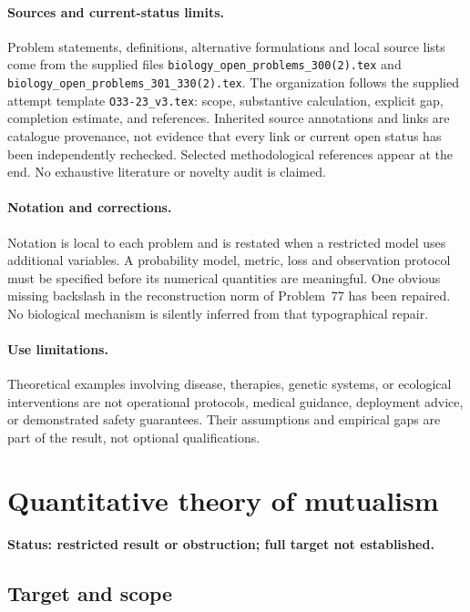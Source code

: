 \documentclass[11pt]{article}
\begin{document}
\paragraph{Sources and current-status limits.}
Problem statements, definitions, alternative formulations and local source lists
come from the supplied files
\texttt{biology\_open\_problems\_300(2).tex} and
\texttt{biology\_open\_problems\_301\_330(2).tex}.
The organization follows the supplied attempt template
\texttt{O33-23\_v3.tex}: scope, substantive calculation, explicit gap,
completion estimate, and references. Inherited source annotations and links are
catalogue provenance, not evidence that every link or current open status has
been independently rechecked. Selected methodological references appear at the
end. No exhaustive literature or novelty audit is claimed.

\paragraph{Notation and corrections.}
Notation is local to each problem and is restated when a restricted model uses
additional variables. A probability model, metric, loss and observation protocol
must be specified before its numerical quantities are meaningful. One obvious
missing backslash in the reconstruction norm of Problem~77 has been repaired.
No biological mechanism is silently inferred from that typographical repair.

\paragraph{Use limitations.}
Theoretical examples involving disease, therapies, genetic systems, or ecological
interventions are not operational protocols, medical guidance, deployment advice,
or demonstrated safety guarantees. Their assumptions and empirical gaps are part
of the result, not optional qualifications.


\section*{Quantitative theory of mutualism}
\label{prob:186}
\noindent\textbf{Status: restricted result or obstruction; full target not established.}
\subsection{Target and scope}
\end{document}
